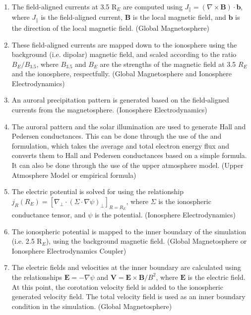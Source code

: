 \documentclass[twoside,10pt]{article}
\begin{document}
\begin{enumerate}

\item
The field-aligned currents at 3.5 R$_E$ are computed using
$J_{\parallel} = ({\nabla}{\times}{\mathbf{B}}){\cdot}{\mathbf{b}}$,
where $J_{\parallel}$ is the field-aligned current, $\mathbf{B}$ is
the local magnetic field, and $\mathbf{b}$ is the direction of the
local magnetic field. (Global Magnetosphere)

\item
These field-aligned currents are mapped down to the ionosphere using
the background (i.e. dipolar) magnetic field, and scaled according to
the ratio $B_{E}/B_{3.5}$, where $B_{3.5}$ and $B_{E}$ are the
strengths of the magnetic field at 3.5 $R_E$ and the ionosphere,
respectfully. (Global Magnetosphere and Ionosphere Electrodynamics)

\item
An auroral precipitation pattern is generated based on the
field-aligned currents from the magnetosphere. (Ionosphere
Electrodynamics)

\item
The auroral pattern and the solar illumination are used to generate
Hall and Pedersen conductances.  This can be done through the use of
the \cite{robinson87} and \cite{moen93} formulation, which takes the
average and total electron energy flux and converts them to Hall and
Pedersen conductances based on a simple formula.  It can also be done
through the use of the upper atmosphere model. (Upper Atmosphere
Model or empirical formula)

\item
The electric potential is solved for using the relationship $j_R(R_E)
=[{\nabla}_{\perp}{\cdot}({\Sigma}{\cdot}{\nabla}{\psi})_{\perp}]_{R=R_E}$,
where $\Sigma$ is the ionospheric conductance tensor, and $\psi$ is
the potential. (Ionosphere Electrodynamics)

\item
The ionospheric potential is mapped to the inner boundary of the
simulation (i.e. 2.5 R$_E$), using the background magnetic field.
(Global Magnetosphere or Ionosphere Electrodynamics Coupler)

\item
The electric fields and velocities at the inner boundary are
calculated using the relationships $\mathbf{E}=-{\nabla}{\psi}$ and
$\mathbf{V}=\mathbf{E}{\times}\mathbf{B}/B^2$, where $\mathbf{E}$ is
the electric field.  At this point, the corotation velocity field is
added to the ionospheric generated velocity field.  The total velocity
field is used as an inner boundary condition in the simulation.
(Global Magnetosphere)

\end{enumerate}
\end{document}
